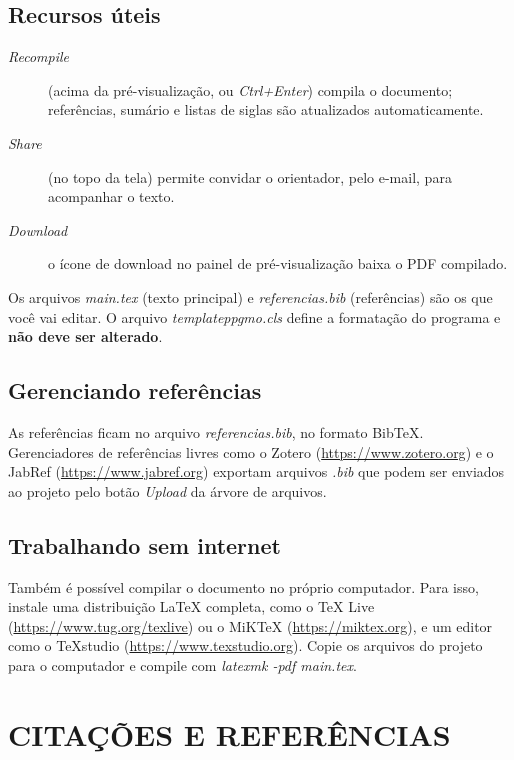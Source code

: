 \documentclass{templateppgmo}
\numberwithin{figure}{chapter}
\numberwithin{table}{chapter}
\numberwithin{quadro}{chapter}
\numberwithin{algoritmo}{chapter}
\numberwithin{codigo}{chapter}
\begin{document}
  	\section{Recursos úteis}

  	\begin{description}
  	\item[\textit{Recompile}] (acima da pré-visualização, ou \textit{Ctrl+Enter}) compila o documento; referências, sumário e listas de siglas são atualizados automaticamente.
  	\item[\textit{Share}] (no topo da tela) permite convidar o orientador, pelo e-mail, para acompanhar o texto.
  	\item[\textit{Download}] o ícone de download no painel de pré-visualização baixa o PDF compilado.
  	\end{description}

  	Os arquivos \textit{main.tex} (texto principal) e \textit{referencias.bib} (referências) são os que você vai editar. O arquivo \textit{templateppgmo.cls} define a formatação do programa e \textbf{não deve ser alterado}.

  	\section{Gerenciando referências}

  	As referências ficam no arquivo \textit{referencias.bib}, no formato BibTeX. Gerenciadores de referências livres como o Zotero (\url{https://www.zotero.org}) e o JabRef (\url{https://www.jabref.org}) exportam arquivos \textit{.bib} que podem ser enviados ao projeto pelo botão \textit{Upload} da árvore de arquivos.

  	\section{Trabalhando sem internet}

  	Também é possível compilar o documento no próprio computador. Para isso, instale uma distribuição \LaTeX{} completa, como o TeX Live (\url{https://www.tug.org/texlive}) ou o MiKTeX (\url{https://miktex.org}), e um editor como o TeXstudio (\url{https://www.texstudio.org}). Copie os arquivos do projeto para o computador e compile com \textit{latexmk -pdf main.tex}.


  	\chapter{CITAÇÕES E REFERÊNCIAS}
\end{document}
